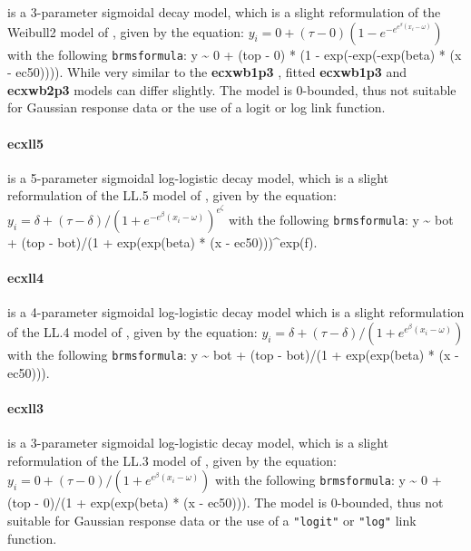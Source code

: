 \documentclass[
  shortnames]{jss}
\begin{document}
is a 3-parameter sigmoidal decay model, which is a slight reformulation of the Weibull2 model of \citet{Ritz2016}, given by the equation:
\(y_i = {0} + (\tau -{0}) (1 - e^{-e^{e^{\beta} (x_i - \omega)}})\)
with the following \texttt{brmsformula}: y \textasciitilde{} 0 + (top - 0) * (1 - exp(-exp(-exp(beta) * (x - ec50)))). While very similar to the \textbf{ecxwb1p3} \citep[according to][]{Ritz2016}, fitted \textbf{ecxwb1p3} and \textbf{ecxwb2p3} models can differ slightly. The model is 0-bounded, thus not suitable for Gaussian response data or the use of a logit or log link function.

\hypertarget{ecxll5}{%
\paragraph{ecxll5}\label{ecxll5}}

is a 5-parameter sigmoidal log-logistic decay model, which is a slight reformulation of the LL.5 model of \citet{Ritz2016}, given by the equation:
\(y_i = \delta + (\tau - \delta) / (1 + e^{-e^{\beta} (x_i - \omega)})^{e^\zeta}\)
with the following \texttt{brmsformula}: y \textasciitilde{} bot + (top - bot)/(1 + exp(exp(beta) * (x - ec50)))\^{}exp(f).

\hypertarget{ecxll4}{%
\paragraph{ecxll4}\label{ecxll4}}

is a 4-parameter sigmoidal log-logistic decay model which is a slight reformulation of the LL.4 model of \citet{Ritz2016}, given by the equation:
\(y_i = \delta + (\tau - \delta)/ (1 + e^{e^{\beta} (x_i - \omega)})\)
with the following \texttt{brmsformula}: y \textasciitilde{} bot + (top - bot)/(1 + exp(exp(beta) * (x - ec50))).

\hypertarget{ecxll3}{%
\paragraph{ecxll3}\label{ecxll3}}

is a 3-parameter sigmoidal log-logistic decay model, which is a slight reformulation of the LL.3 model of \citet{Ritz2016}, given by the equation:
\(y_i = 0 + (\tau - 0)/ (1 + e^{e^{\beta} (x_i - \omega)})\)
with the following \texttt{brmsformula}: y \textasciitilde{} 0 + (top - 0)/(1 + exp(exp(beta) * (x - ec50))).
The model is 0-bounded, thus not suitable for Gaussian response data or the use of a \texttt{"logit"} or \texttt{"log"} link function.
\end{document}
